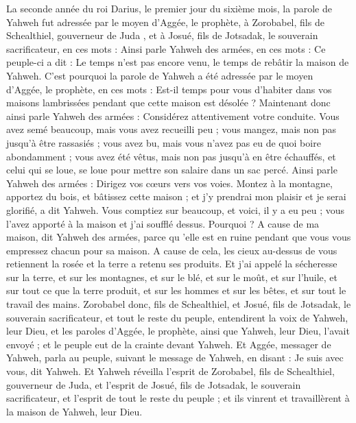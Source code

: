 \begin{multicols}{2}
\VerseOne{}La seconde année du roi Darius, le premier jour du sixième mois, la parole de Yahweh fut adressée par le moyen d'Aggée, le prophète, à Zorobabel, fils de Schealthiel, gouverneur de Juda , et à Josué, fils de Jotsadak, le souverain sacrificateur, en ces mots :
Ainsi parle Yahweh des armées, en ces mots : Ce peuple-ci a dit : Le temps n'est pas encore venu, le temps de rebâtir la maison de Yahweh.
C'est pourquoi la parole de Yahweh a été adressée par le moyen d'Aggée, le prophète, en ces mots :
Est-il temps pour vous d'habiter dans vos maisons lambrissées pendant que cette maison est désolée ?
Maintenant donc ainsi parle Yahweh des armées : Considérez attentivement votre conduite.
Vous avez semé beaucoup, mais vous avez recueilli peu ; vous mangez, mais non pas jusqu'à être rassasiés ; vous avez bu, mais vous n'avez pas eu de quoi boire abondamment ; vous avez été vêtus, mais non pas jusqu'à en être échauffés, et celui qui se loue, se loue pour mettre son salaire dans un sac percé.
Ainsi parle Yahweh des armées : Dirigez vos cœurs vers vos voies.
Montez à la montagne, apportez du bois, et bâtissez cette maison ; et j'y prendrai mon plaisir et je serai glorifié, a dit Yahweh.
Vous comptiez sur beaucoup, et voici, il y a eu peu ; vous l'avez apporté à la maison et j'ai soufflé dessus. Pourquoi ? A cause de ma maison, dit Yahweh des armées, parce qu 'elle est en ruine pendant que vous vous empressez chacun pour sa maison.
A cause de cela, les cieux au-dessus de vous retiennent la rosée et la terre a retenu ses produits.
Et j'ai appelé la sécheresse sur la terre, et sur les montagnes, et sur le blé, et sur le moût, et sur l'huile, et sur tout ce que la terre produit, et sur les hommes et sur les bêtes, et sur tout le travail des mains.
Zorobabel donc, fils de Schealthiel, et Josué, fils de Jotsadak, le souverain sacrificateur, et tout le reste du peuple, entendirent la voix de Yahweh, leur Dieu, et les paroles d'Aggée, le prophète, ainsi que Yahweh, leur Dieu, l'avait envoyé ; et le peuple eut de la crainte devant Yahweh.
Et Aggée, messager de Yahweh, parla au peuple, suivant le message de Yahweh, en disant : Je suis avec vous, dit Yahweh.
Et Yahweh réveilla l'esprit de Zorobabel, fils de Schealthiel, gouverneur de Juda, et l'esprit de Josué, fils de Jotsadak, le souverain sacrificateur, et l'esprit de tout le reste du peuple ; et ils vinrent et travaillèrent à la maison de Yahweh, leur Dieu.

\end{multicols}
